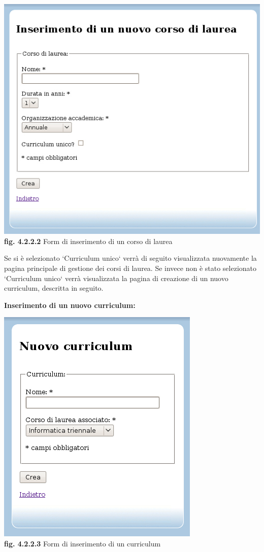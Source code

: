 \documentclass[11pt,a4paper]{article}
\begin{document}
\bigskip
\begin{center}
	\includegraphics[scale=0.5]{images/nuovo_corso.jpg}\\
	\textbf{fig. 4.2.2.2} Form di inserimento di un corso di laurea\\
\end{center}
\bigskip

Se si è selezionato `Curriculum unico` verrà di seguito visualizzata nuovamente la pagina principale di gestione dei corsi di laurea.
Se invece non è stato selezionato `Curriculum unico` verrà visualizzata la pagina di creazione di un nuovo curriculum, descritta in seguito.
\newpage
\begin{large}\textbf{Inserimento di un nuovo curriculum:}\end{large}

\bigskip
\begin{center}
	\includegraphics[scale=0.5]{images/nuovo_curriculum.jpg}\\
	\textbf{fig. 4.2.2.3} Form di inserimento di un curriculum\\
\end{center}
\bigskip
\end{document}
